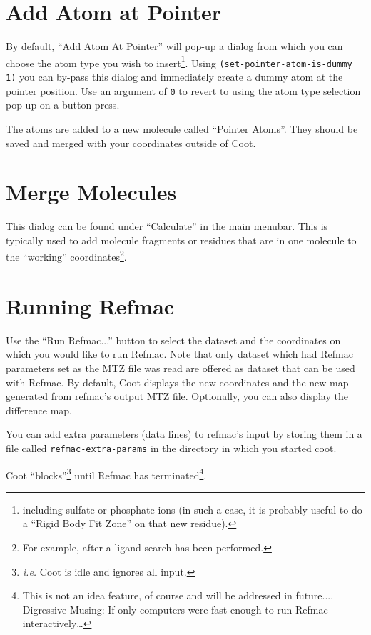\documentclass{book}
\begin{document}
\section{Add Atom at Pointer}
By default, ``Add Atom At Pointer'' will pop-up a dialog from which
you can choose the atom type you wish to insert\footnote{including
  sulfate or phosphate ions (in such a case, it is probably useful to
do a ``Rigid Body Fit Zone'' on that new residue).}.  Using
\texttt{(set-pointer-atom-is-dummy 1)} you can by-pass this dialog and
immediately create a dummy atom at the pointer position.  Use an
argument of \texttt{0} to revert to using the atom type selection
pop-up on a button press.

The atoms are added to a new molecule called ``Pointer Atoms''.  They
should be saved and merged with your coordinates outside of Coot.

\section{Merge Molecules}
\label{sec:merge_molecules}
This dialog can be found under ``Calculate'' in the main menubar.
This is typically used to add molecule fragments or residues that are
in one molecule to the ``working'' coordinates\footnote{For example,
  after a ligand search has been performed.}.


\section{Running Refmac}
Use the ``Run Refmac...'' button to select the dataset and the
coordinates on which you would like to run Refmac.  Note that only
dataset which had Refmac parameters set as the MTZ file was read are
offered as dataset that can be used with Refmac. By default, Coot
displays the new coordinates and the new map generated from refmac's
output MTZ file.  Optionally, you can also display the difference map.

You can add extra parameters  (data lines) to
refmac's input by storing them in a file called
\texttt{refmac-extra-params} in the directory in which you started
coot.

Coot ``blocks''\footnote{\emph{i.e.} Coot is idle and ignores all
  input.} until Refmac has terminated\footnote{This is not an idea
  feature, of course and will be addressed in future.... Digressive
  Musing: If only computers were fast enough to run Refmac
  interactively\ldots}.
\end{document}
